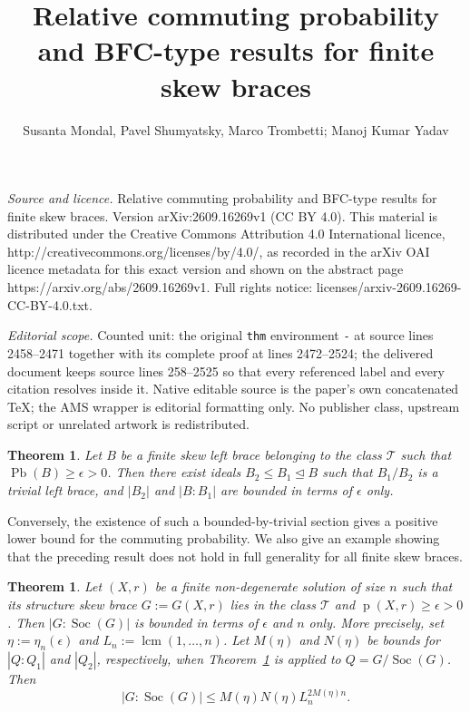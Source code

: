 \documentclass[10pt,a4paper]{amsart}
\numberwithin{equation}{section}
\newtheorem{thm}[equation]{Theorem}
\newcommand{\Pb}{\operatorname{Pb} }
\newcommand{\Soc}{\operatorname{Soc} }
\begin{document}
\title[Relative commuting probability and BFC-type results for fini]{Relative commuting probability and BFC-type results for finite skew braces}
\author{Susanta Mondal, Pavel Shumyatsky, Marco Trombetti; Manoj Kumar Yadav}
\date{}
\maketitle
\noindent\emph{Source and licence.} Relative commuting probability and BFC-type results for finite skew braces. Version arXiv:2609.16269v1 (CC BY 4.0). This material is distributed under the Creative Commons Attribution 4.0 International licence, http://creativecommons.org/licenses/by/4.0/, as recorded in the arXiv OAI licence metadata for this exact version and shown on the abstract page https://arxiv.org/abs/2609.16269v1. Full rights notice: licenses/arxiv-2609.16269-CC-BY-4.0.txt.\par\smallskip
\noindent\textit{Editorial scope.} Counted unit: the original \texttt{thm} environment \texttt{-} at source lines 2458--2471 together with its complete proof at lines 2472--2524; the delivered document keeps source lines 258--2525 so that every referenced label and every citation resolves inside it. Native editable source is the paper's own concatenated TeX; the AMS wrapper is editorial formatting only. No publisher class, upstream script or unrelated artwork is redistributed.
\begin{thm}\label{main-2}
Let $B$ be a finite skew left brace belonging to the class $\mathcal T$ such that $\Pb(B)\geqslant\epsilon>0$. Then there exist ideals $B_2 \leqslant B_1\trianglelefteq B$ such that $B_1/B_2$ is a trivial left brace, and $|B_2|$ and $|B:B_1|$ are bounded in terms of $\epsilon$ only.
\end{thm}

Conversely, the existence of such a bounded-by-trivial section gives a positive lower bound for the commuting probability. We also give an example showing that the preceding result does not hold in full generality for all finite skew braces.

\begin{thm}\label{main-3}
Let $(X,r)$ be a finite non-degenerate solution of size $n$ such that its structure skew brace $G:=G(X,r)$ lies in the class $\mathcal{T}$ and
$\operatorname{p}(X,r)\geqslant\epsilon>0$. Then
$|G:\Soc(G)|$ is bounded in terms of $\epsilon$ and $n$ only.
More precisely, set $\eta :=\eta_n(\epsilon)$ and
$L_n :=\operatorname{lcm}(1,\ldots,n)$. Let $M(\eta)$ and $N(\eta)$ be bounds for $|Q:Q_1|$ and $|Q_2|$, respectively, when Theorem~\ref{main-2} is applied to $Q=G/\Soc(G)$. Then
$$
|G :\Soc(G)|
\leqslant M(\eta)N(\eta)L_n^{2M(\eta)n}.
$$
\end{thm}
\end{document}

